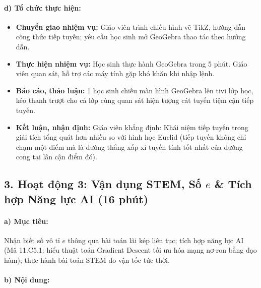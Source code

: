 \documentclass[12pt, a4paper]{article}
\begin{document}
\paragraph{d) Tổ chức thực hiện:}
\begin{itemize}[leftmargin=0.8cm]
    \item \textbf{Chuyển giao nhiệm vụ:} Giáo viên trình chiếu hình vẽ TikZ, hướng dẫn công thức tiếp tuyến; yêu cầu học sinh mở GeoGebra thao tác theo hướng dẫn.
    \item \textbf{Thực hiện nhiệm vụ:} Học sinh thực hành GeoGebra trong 5 phút. Giáo viên quan sát, hỗ trợ các máy tính gặp khó khăn khi nhập lệnh.
    \item \textbf{Báo cáo, thảo luận:} 1 học sinh chiếu màn hình GeoGebra lên tivi lớp học, kéo thanh trượt cho cả lớp cùng quan sát hiện tượng cát tuyến tiệm cận tiếp tuyến.
    \item \textbf{Kết luận, nhận định:} Giáo viên khẳng định: Khái niệm tiếp tuyến trong giải tích tổng quát hơn nhiều so với hình học Euclid (tiếp tuyến không chỉ chạm một điểm mà là đường thẳng xấp xỉ tuyến tính tốt nhất của đường cong tại lân cận điểm đó).
\end{itemize}

\subsection*{3. Hoạt động 3: Vận dụng STEM, Số $e$ \& Tích hợp Năng lực AI (16 phút)}

\paragraph{a) Mục tiêu:} Nhận biết số vô tỉ $e$ thông qua bài toán lãi kép liên tục; tích hợp năng lực AI (Mã 11.C5.1: hiểu thuật toán Gradient Descent tối ưu hóa mạng nơ-ron bằng đạo hàm); thực hành bài toán STEM đo vận tốc tức thời.

\paragraph{b) Nội dung:}
\end{document}
